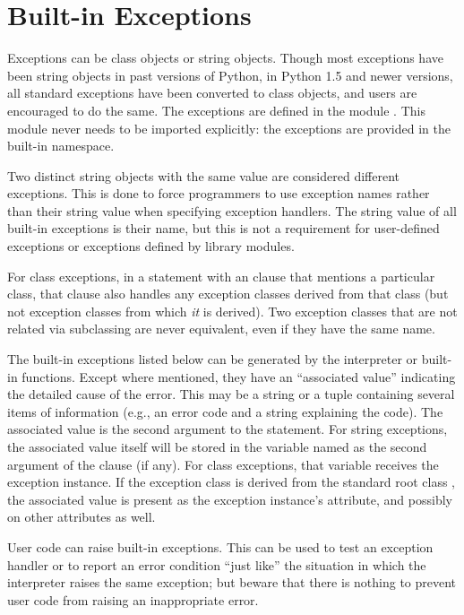 \section{Built-in Exceptions}



Exceptions can be class objects or string objects.  Though most
exceptions have been string objects in past versions of Python, in
Python 1.5 and newer versions, all standard exceptions have been
converted to class objects, and users are encouraged to do the same.
The exceptions are defined in the module .  This
module never needs to be imported explicitly: the exceptions are
provided in the built-in namespace.

Two distinct string objects with the same value are considered different
exceptions.  This is done to force programmers to use exception names
rather than their string value when specifying exception handlers.
The string value of all built-in exceptions is their name, but this is
not a requirement for user-defined exceptions or exceptions defined by
library modules.

For class exceptions, in a  statement with
an  clause that mentions a particular
class, that clause also handles any exception classes derived from
that class (but not exception classes from which \emph{it} is
derived).  Two exception classes that are not related via subclassing
are never equivalent, even if they have the same name.

The built-in exceptions listed below can be generated by the
interpreter or built-in functions.  Except where mentioned, they have
an ``associated value'' indicating the detailed cause of the error.
This may be a string or a tuple containing several items of
information (e.g., an error code and a string explaining the code).
The associated value is the second argument to the
 statement.  For string exceptions, the
associated value itself will be stored in the variable named as the
second argument of the  clause (if any).  For class
exceptions, that variable receives the exception instance.  If the
exception class is derived from the standard root class
, the associated value is present as the
exception instance's  attribute, and possibly on other
attributes as well.

User code can raise built-in exceptions.  This can be used to test an
exception handler or to report an error condition ``just like'' the
situation in which the interpreter raises the same exception; but
beware that there is nothing to prevent user code from raising an
inappropriate error.

